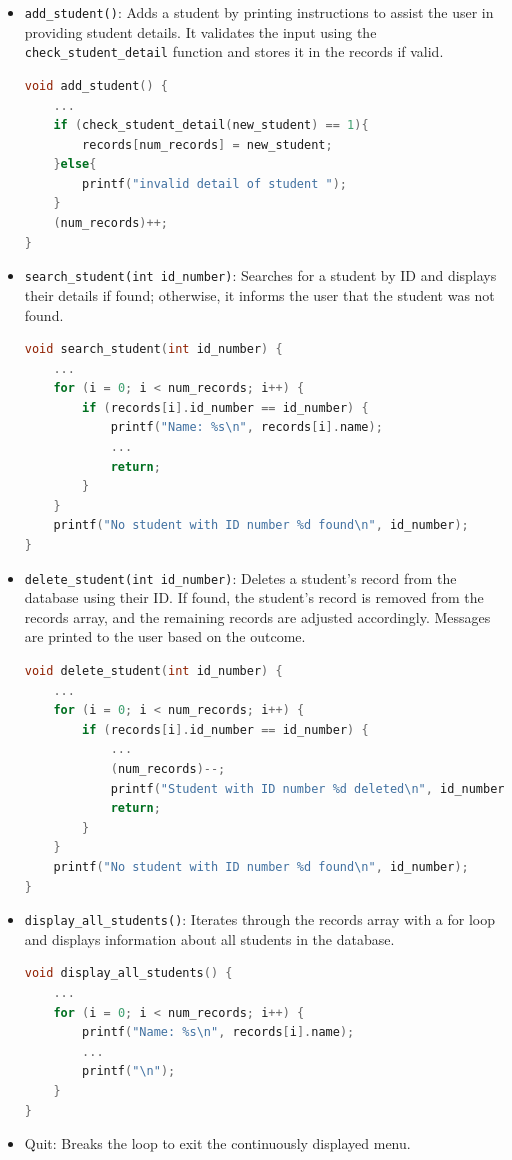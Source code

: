 \documentclass[a4paper, 11pt]{report}
\begin{document}
\begin{itemize}
\item \texttt{add\_student()}: Adds a student by printing instructions to assist the user in providing student details. It validates the input using the \texttt{check\_student\_detail} function and stores it in the records if valid.
\begin{lstlisting}[language=C]
void add_student() {
    ...
    if (check_student_detail(new_student) == 1){
        records[num_records] = new_student;
    }else{
        printf("invalid detail of student ");
    }
    (num_records)++;
}
\end{lstlisting}

\item \texttt{search\_student(int id\_number)}: Searches for a student by ID and displays their details if found; otherwise, it informs the user that the student was not found.
\begin{lstlisting}[language=C]
void search_student(int id_number) {
    ...
    for (i = 0; i < num_records; i++) {
        if (records[i].id_number == id_number) {
            printf("Name: %s\n", records[i].name);
            ...
            return;
        }
    }
    printf("No student with ID number %d found\n", id_number);
}

\end{lstlisting}


\item \texttt{delete\_student(int id\_number)}: Deletes a student's record from the database using their ID. If found, the student's record is removed from the records array, and the remaining records are adjusted accordingly. Messages are printed to the user based on the outcome.
\begin{lstlisting}[language=C]
void delete_student(int id_number) {
    ...
    for (i = 0; i < num_records; i++) {
        if (records[i].id_number == id_number) {
            ...
            (num_records)--;
            printf("Student with ID number %d deleted\n", id_number);
            return;
        }
    }
    printf("No student with ID number %d found\n", id_number);
}

\end{lstlisting}
\item \texttt{display\_all\_students()}: Iterates through the records array with a for loop and displays information about all students in the database.

\begin{lstlisting}[language=C]
void display_all_students() {
    ...
    for (i = 0; i < num_records; i++) {
        printf("Name: %s\n", records[i].name);
        ...
        printf("\n");
    }
}
\end{lstlisting}

\item Quit: Breaks the loop to exit the continuously displayed menu.
\end{itemize}
\end{document}
